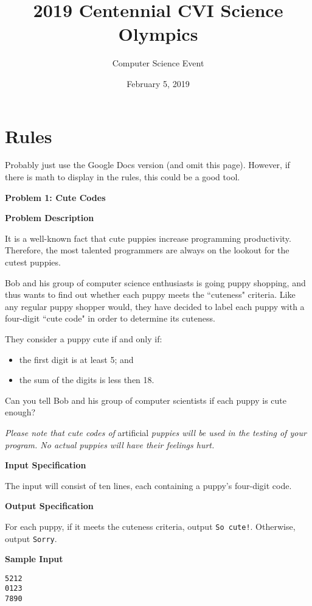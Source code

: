 \documentclass[11pt]{article}
\title{2019 Centennial CVI Science Olympics}
\author{Computer Science Event}
\date{February 5, 2019}
\newcommand{\problem}[2]{\textbf{\Large Problem #1: #2} \vspace{0.4em}}
\newcommand{\heading}[1]{\vspace{0.6em} \textbf{#1}}
\begin{document}
\maketitle

\section{Rules}

Probably just use the Google Docs version (and omit this page). However, if there is math to display in the rules, this could be a good tool.

\pagebreak



\problem{1}{Cute Codes}


\heading{Problem Description}

It is a well-known fact that cute puppies increase programming productivity. Therefore, the most talented programmers are always on the lookout for the cutest puppies.

Bob and his group of computer science enthusiasts is going puppy shopping, and thus wants to find out whether each puppy meets the ``cuteness" criteria. Like any regular puppy shopper would, they have decided to label each puppy with a four-digit ``cute code" in order to determine its cuteness.

They consider a puppy cute if and only if:
\begin{itemize}
    \item the first digit is at least 5; and
    \item the sum of the digits is less then 18.
\end{itemize}

Can you tell Bob and his group of computer scientists if each puppy is cute enough?

\textit{Please note that cute codes of} artificial \textit{puppies will be used in the testing of your program. No actual puppies will have their feelings hurt.}


\heading{Input Specification}

The input will consist of ten lines, each containing a puppy's four-digit code.


\heading{Output Specification}

For each puppy, if it meets the cuteness criteria, output \verb|So cute!|. Otherwise, output \verb|Sorry|.


\heading{Sample Input}
\vspace{-\topsep}
\begin{verbatim}
5212
0123
7890
\end{verbatim}
\end{document}
